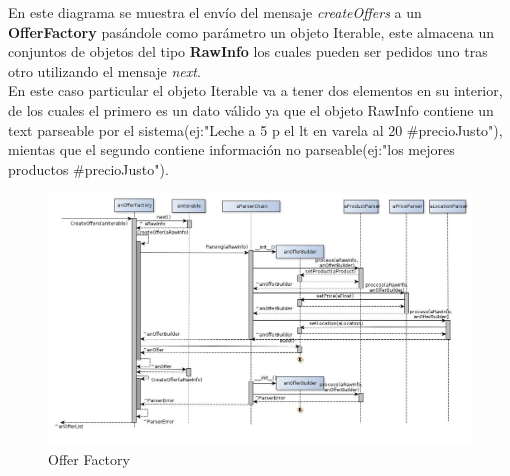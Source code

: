 \documentclass[10pt, a4paper]{article}
\begin{document}
 
\begin{landscape}

En este diagrama se muestra el envío del mensaje \emph{createOffers} a un \textbf{OfferFactory} pasándole como parámetro un objeto Iterable, este almacena un conjuntos de objetos del tipo \textbf{RawInfo} los cuales pueden ser pedidos uno tras otro utilizando el mensaje \emph{next}. \\

En este caso particular el objeto Iterable va a tener dos elementos en su interior, de los cuales el primero es un dato válido ya que el objeto RawInfo contiene un text parseable por el sistema(ej:"Leche a 5 p el lt en varela al 20 \#precioJusto"), mientas que el segundo contiene información no parseable(ej:"los mejores productos \#precioJusto").
\begin{figure}[H]
\centering
\includegraphics[scale=0.55]{graphics/OfferFactory_sequence.jpg}
\caption{Offer Factory}
\end{figure}

\end{landscape}


%
%
%
\end{document}

